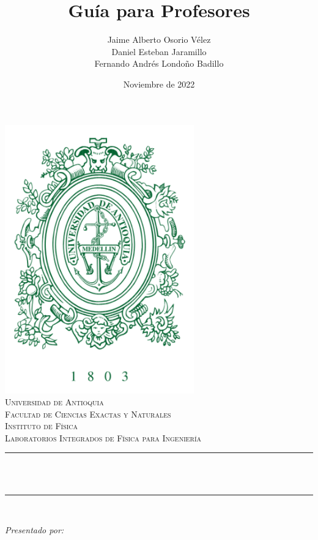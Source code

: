 \documentclass[12pt]{article}
\title{Guía para Profesores}								%
\author{Jaime Alberto Osorio Vélez\\
Daniel Esteban Jaramillo \\
Fernando Andrés Londoño Badillo}								%
\date{Noviembre de 2022}											%
\makeatletter
\let\thetitle\@title
\let\theauthor\@author
\let\thedate\@date
\makeatother
\begin{document}

\begin{titlepage}
	\centering
    \vspace*{0.5 cm}
    \includegraphics[scale = 1.0]{Logo-UdeA.png}\\[0.5 cm]	%
    \textsc{\LARGE Universidad de Antioquia}\\[0.5 cm]	%
	\textsc{\Large Facultad de Ciencias Exactas y Naturales}\\[0.5 cm]
	\textsc{\Large Instituto de Física}\\[2.5 cm]%
	\textsc{\large Laboratorios Integrados de Física para Ingeniería}\\[0.5 cm]				%
	\rule{\linewidth}{0.2 mm} \\[0.4 cm]
	{ \huge \bfseries \thetitle}\\
	\rule{\linewidth}{0.2 mm} \\[1.0 cm]
	
	\begin{minipage}{0.6\textwidth}
		\begin{flushleft} \large
			\emph{Presentado por:}\\
			\theauthor
			\end{flushleft}
			\end{minipage} \\[1 cm]
	
	{\large \thedate}\\[2 cm]
 
	\vfill
	
\end{titlepage}
\end{document}
